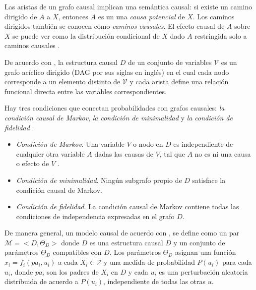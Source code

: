 Las aristas de un grafo causal implican una semántica causal: si existe un camino dirigido de $A$ a $X$, entonces $A$ es un una \textit{causa potencial} de $X$. Los caminos dirigidos también se conocen como \textit{caminos causales}. El efecto causal de $A$ sobre $X$ se puede ver como la distribución condicional de $X$ dado $A$ restringida solo a caminos causales \cite{dasgupta2019causal}.

De acuerdo con \cite{pearl_2009}, la estructura causal $D$ de un conjunto de variables $\mathcal{V}$ es un grafo acíclico dirigido (DAG por sus siglas en inglés) en el cual cada nodo corresponde a un elemento distinto de $\mathcal{V}$ y cada arista define una relación funcional directa entre las
variables correspondientes. 

Hay tres condiciones que conectan probabilidades con
grafos causales: \textit{la condición causal de Markov}, \textit{la condición de minimalidad} y \textit{la condición
de fidelidad} \cite{gonzalez-soto, spirtes2000causation}.

\begin{itemize}
    \item \textit{Condición de Markov}. Una variable $V$ o nodo
    en $D$ es independiente de cualquier otra variable $A$ dadas las causas de $V$, tal que $A$ no es ni una causa o efecto de $V$ .
    \item \textit{Condición de minimalidad}. Ningún subgrafo propio de $D$ satisface la condición causal de Markov.
    \item \textit{Condición de fidelidad}. La condición causal de Markov contiene todas las condiciones de independencia expresadas en el grafo $D$.
\end{itemize}

De manera general, un modelo causal de acuerdo con \cite{pearl_2009}, se define como un par $\mathcal{M} = <D, \Theta_D>$ donde $D$
es una estructura causal 
$D$ y un conjunto de 
parámetros $\Theta_D$ compatibles con $D$. Los 
parámetros $\Theta_D$ asignan una función $x_i = f_i (pa_i, u_i)$ a cada $X_i \in\mathcal{V}$
y una medida de  probabilidad  $P(u_i)$ para cada $u_i$, donde $pa_i$ son 
los padres de $X_i$ en $D$ y cada $u_i$ es una perturbación aleatoria distribuida
de acuerdo a $P(u_i)$, independiente de todas las otras $u$.


